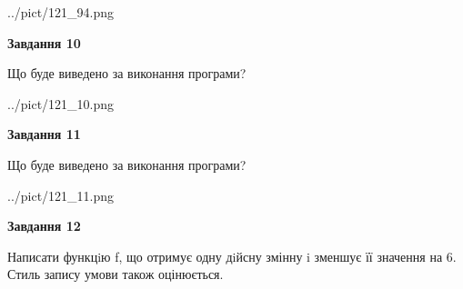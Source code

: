 \documentclass[12pt, ukrainian]{article}
\begin{document}
{\begin {large}
\begin{center}
	{../pict/121_94.png}
\end{center}
\newpage

{\begin {center}\textbf{Завдання 10}\end {center}}

Що буде виведено за виконання програми?\par
\begin{center}
	{../pict/121_10.png}
\end{center}
\newpage

{\begin {center}\textbf{Завдання 11}\end {center}}

Що буде виведено за виконання програми?\par
\begin{center}
	{../pict/121_11.png}
\end{center}
\newpage

{\begin {center}\textbf{Завдання 12}\end {center}}


Написати функцiю f, що отримує одну дiйсну змінну i зменшує її значення на 6. Стиль запису умови також оцінюється.\par
\newpage

\end {large}}
\end{document}
